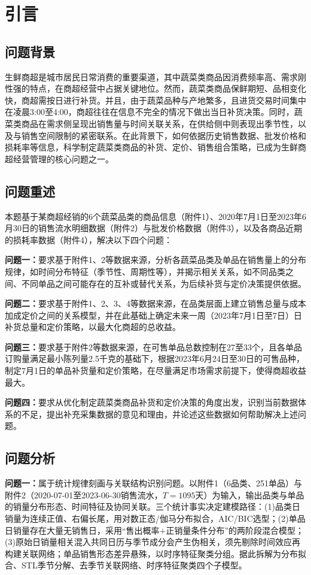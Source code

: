 \section{引言}
\subsection{问题背景}
生鲜商超是城市居民日常消费的重要渠道，其中蔬菜类商品因消费频率高、需求刚性强的特点，在商超经营中占据关键地位。然而，蔬菜类商品保鲜期短、品相变化快，商超需按日进行补货。并且，由于蔬菜品种与产地繁多，且进货交易时间集中在凌晨3:00至4:00，商超往往在信息不完全的情况下做出当日补货决策。同时，蔬菜类商品在需求侧呈现出销售量与时间关联关系，在供给侧中则表现出季节性，以及与销售空间限制的紧密联系。在此背景下，如何依据历史销售数据、批发价格和损耗率等信息，科学制定蔬菜类商品的补货、定价、销售组合策略，已成为生鲜商超经营管理的核心问题之一。

\subsection{问题重述}
本题基于某商超经销的6个蔬菜品类的商品信息（附件1）、2020年7月1日至2023年6月30日的销售流水明细数据（附件2）与批发价格数据（附件3），以及各商品近期的损耗率数据（附件4），解决以下四个问题：

\textbf{问题一：}要求基于附件1、2等数据来源，分析各蔬菜品类及单品在销售量上的分布规律，如时间分布特征（季节性、周期性等），并揭示相关关系，如不同品类之间、不同单品之间可能存在的互补或替代关系，为后续补货与定价决策提供依据。

\textbf{问题二：}要求基于附件1、2、3、4等数据来源，在品类层面上建立销售总量与成本加成定价之间的关系模型，并在此基础上确定未来一周（2023年7月1日至7日）日补货总量和定价策略，以最大化商超的总收益。

\textbf{问题三：}要求基于附件2等数据来源，在可售单品总数控制在27至33个，且各单品订购量满足最小陈列量2.5千克的基础下，根据2023年6月24日至30日的可售品种，制定7月1日的单品补货量和定价策略，在尽量满足市场需求前提下，使得商超收益最大。

\textbf{问题四：}要求从优化制定蔬菜类商品补货和定价决策的角度出发，识别当前数据体系的不足，提出补充采集数据的意见和理由，并论述这些数据如何帮助解决上述问题。

\subsection{问题分析}

\textbf{问题一：}属于统计规律刻画与关联结构识别问题。以附件1（6品类、251单品）与附件2（2020-07-01至2023-06-30销售流水，$T=1095$天）为输入，输出品类与单品的销量分布形态、时间特征及协同关联。三个统计事实决定建模路径：(1)品类日销量为连续正值、右偏长尾，用对数正态/伽马分布拟合，AIC/BIC选型；(2)单品日销量存在大量无销售日，采用“售出概率$+$正销量条件分布”的两阶段混合模型；(3)原始日销量相关混入共同日历与季节成分会产生伪相关\cite{yule1926}，须先剔除时间效应再构建关联网络；单品销售形态差异悬殊，以时序特征聚类分组。据此拆解为分布拟合、STL季节分解、去季节关联网络、时序特征聚类四个子模型。

